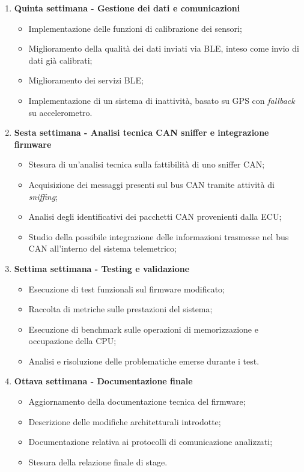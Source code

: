 \begin{enumerate}
    \item \textbf{Quinta settimana - Gestione dei dati e comunicazioni}
    \begin{itemize}
        \item Implementazione delle funzioni di calibrazione dei sensori;
        \item Miglioramento della qualità dei dati inviati via BLE, inteso 
        come invio di dati già calibrati;
        \item Miglioramento dei servizi BLE;
        \item Implementazione di un sistema di inattività, basato su GPS con \textit{fallback}
        su accelerometro.
    \end{itemize}

    \item \textbf{Sesta settimana - Analisi tecnica CAN sniffer e integrazione firmware}
    \begin{itemize}
        \item Stesura di un'analisi tecnica sulla fattibilità di uno sniffer CAN;
        \item Acquisizione dei messaggi presenti sul bus CAN tramite attività di \textit{sniffing};
        \item Analisi degli identificativi dei pacchetti CAN provenienti dalla ECU;
        \item Studio della possibile integrazione delle informazioni trasmesse nel bus CAN all'interno 
        del sistema telemetrico;
    \end{itemize}

    \item \textbf{Settima settimana - Testing e validazione}
    \begin{itemize}
        \item Esecuzione di test funzionali sul firmware modificato;
        \item Raccolta di metriche sulle prestazioni del sistema;
        \item Esecuzione di benchmark sulle operazioni di memorizzazione e occupazione della CPU;
        \item Analisi e risoluzione delle problematiche emerse durante i test.
    \end{itemize}

    \item \textbf{Ottava settimana - Documentazione finale}
    \begin{itemize}
        \item Aggiornamento della documentazione tecnica del firmware;
        \item Descrizione delle modifiche architetturali introdotte;
        \item Documentazione relativa ai protocolli di comunicazione analizzati;
        \item Stesura della relazione finale di stage.
    \end{itemize}

\end{enumerate}


